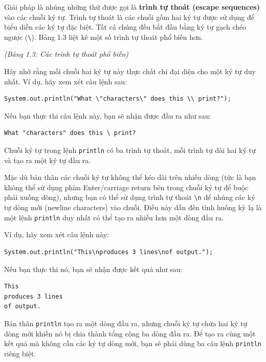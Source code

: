 Giải pháp là nhúng những thứ được gọi là \textbf{trình tự thoát (escape
sequences)} vào các chuỗi ký tự. Trình tự thoát là các chuỗi gồm hai ký
tự được sử dụng để biểu diễn các ký tự đặc biệt. Tất cả chúng đều bắt
đầu bằng ký tự gạch chéo ngược (\texttt{\textbackslash{}}). Bảng 1.3
liệt kê một số trình tự thoát phổ biến hơn.

\emph{(Bảng 1.3: Các trình tự thoát phổ biến)}

Hãy nhớ rằng mỗi chuỗi hai ký tự này thực chất chỉ đại diện cho một ký
tự duy nhất. Ví dụ, hãy xem xét câu lệnh sau:

\begin{verbatim}
System.out.println("What \"characters\" does this \\ print?");
\end{verbatim}

Nếu bạn thực thi câu lệnh này, bạn sẽ nhận được đầu ra như sau:

\begin{verbatim}
What "characters" does this \ print?
\end{verbatim}

Chuỗi ký tự trong lệnh \texttt{println} có ba trình tự thoát, mỗi trình
tự dài hai ký tự và tạo ra một ký tự đầu ra.

Mặc dù bản thân các chuỗi ký tự không thể kéo dài trên nhiều dòng (tức
là bạn không thể sử dụng phím Enter/carriage return bên trong chuỗi ký
tự để buộc phải xuống dòng), nhưng bạn có thể sử dụng trình tự thoát
\texttt{\textbackslash{}n} để nhúng các ký tự dòng mới (newline
characters) vào chuỗi. Điều này dẫn đến tình huống kỳ lạ là một lệnh
\texttt{println} duy nhất có thể tạo ra nhiều hơn một dòng đầu ra.

Ví dụ, hãy xem xét câu lệnh này:

\begin{verbatim}
System.out.println("This\nproduces 3 lines\nof output.");
\end{verbatim}

Nếu bạn thực thi nó, bạn sẽ nhận được kết quả như sau:

\begin{verbatim}
This 
produces 3 lines 
of output.
\end{verbatim}

Bản thân \texttt{println} tạo ra một dòng đầu ra, nhưng chuỗi ký tự chứa
hai ký tự dòng mới khiến nó bị chia thành tổng cộng ba dòng đầu ra. Để
tạo ra cùng một kết quả mà không cần các ký tự dòng mới, bạn sẽ phải
dùng ba câu lệnh \texttt{println} riêng biệt.

